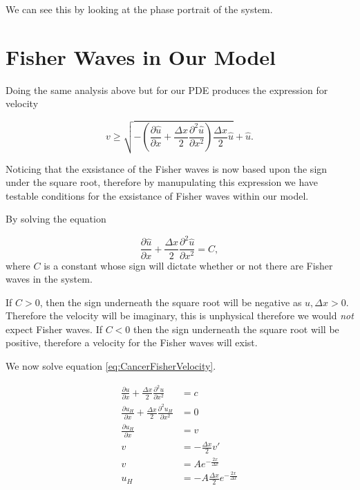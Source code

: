 \documentclass[11pt, a4paper]{article}
\begin{document}
We can see this by looking at the phase portrait of the system. 

\begin{figure}[H]
\begin{subfigure}[h]{0.5\textwidth}

\end{subfigure}
\begin{subfigure}[h]{0.5\textwidth}

\end{subfigure}
\end{figure}

\newpage

\section{Fisher Waves in Our Model}

Doing the same analysis above but for our PDE produces the expression for velocity

\begin{equation}
v \geq \sqrt{- \left( \frac{\partial \hat{u}}{\partial x} + \frac{\Delta x}{2} \frac{\partial ^2 \hat{u}}{\partial x^2} \right) \frac{\Delta x}{2} \hat{u} } + \hat{u}.
\end{equation}

Noticing that the exsistance of the Fisher waves is now based upon the sign under the square root, therefore by manupulating this expression we have testable conditions for the exsistance of Fisher waves within our model. 

By solving the equation 

\begin{equation}
\frac{\partial \hat{u}}{\partial x} + \frac{\Delta x}{2} \frac{\partial ^2 \hat{u}}{\partial x^2}  = C, 
\label{eq:CancerFisherVelocity}
\end{equation}
where $C$ is a constant whose sign will dictate whether or not there are Fisher waves in the system. 

If $C > 0$, then the sign underneath the square root will be negative as $u, \Delta x > 0 $. Therefore the velocity will be imaginary, this is unphysical therefore we would \textit{not} expect Fisher waves. 
If $C < 0 $ then the sign underneath the square root will be positive, therefore a velocity for the Fisher waves will exist. 

We now solve equation \eqref{eq:CancerFisherVelocity}. 

\begin{align*}
\frac{\partial u}{\partial x} + \frac{\Delta x}{2} \frac{\partial ^2 u}{\partial x ^2} & = c \\
\frac{\partial u_H}{\partial x} + \frac{\Delta x}{2} \frac{\partial ^2 u_H}{\partial x ^2} & = 0 \\
\frac{\partial u_H}{\partial x} & = v \\
v & = - \frac{\Delta x}{2} v' \\ 
v & = A e ^{- \frac{2x}{\Delta x}} \\
u _H & = - A \frac{\Delta x}{2} e ^{- \frac{2x}{\Delta x}}
\end{align*}
\end{document}
